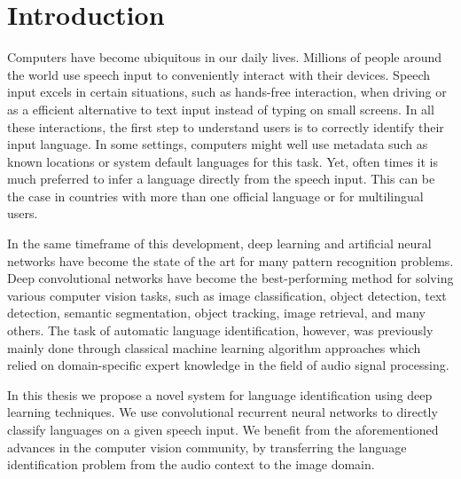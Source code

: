 \section{Introduction}


Computers have become ubiquitous in our daily lives. Millions of people around the world use speech input to conveniently interact with their devices.
Speech input excels in certain situations, such as hands-free interaction, when driving or as a efficient alternative to text input instead of typing on small screens.
In all these interactions, the first step to understand users is to correctly identify their input language. In some settings, computers might well use metadata such as known locations or system default languages for this task. Yet, often times it is much preferred to infer a language directly from the speech input. This can be the case in countries with more than one official language or for multilingual users. 

In the same timeframe of this development, deep learning and artificial neural networks have become the state of the art for many pattern recognition problems. 
Deep convolutional networks have become the best-performing method for solving various computer vision tasks, such as image classification\cite{russakovsky2015imagenet}, object detection\cite{russakovsky2015imagenet, everingham2010pascal}, text detection\cite{Yang2016SceneTextRegAR, jaderberg2014synthetic}, semantic segmentation\cite{dai2016instance, girshick2014rich}, object tracking\cite{nam2016learning}, image retrieval\cite{tolias2015particular}, and many others. 
The task of automatic language identification, however, was previously mainly done through classical machine learning algorithm approaches which relied on domain-specific expert knowledge in the field of audio signal processing.

In this thesis we propose a novel system for language identification using deep learning techniques. We use convolutional recurrent neural networks to directly classify languages on a given speech input. We benefit from the aforementioned advances in the computer vision community, by transferring the language identification problem from the audio context to the image domain.



